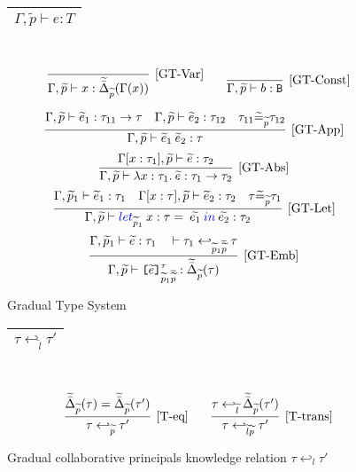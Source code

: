 \documentclass{article}
\newcommand{\emb}[3]{\texttt{[}#1\texttt{]}_{#2}^{#3}}
\newcommand{\tslam}[3]{\lambda #1 : #2. \: #3}
\newcommand{\plet}[5]{\textcolor[rgb]{0,0,1}{let}_{#1} \: {#2}:{#3} = \: #4 \: \textcolor[rgb]{0,0,1}{in} \: #5}
\newcommand\rulename[1]{\mathrm{\text{[#1]}}}
\newcommand\wt[1]{\widetilde{#1}}
\begin{document}
\begin{figure}[!htbp]
\begin{tabular}{ |c| } 
 \hline
 $\Gamma, \wt{p} \vdash e : T$  \\
 \hline
\end{tabular} \\
\[
\begin{tabular}{c c} 
\infer[\mathrm{\text{[GT-Var]}}] 
{\Gamma , \wt{p} \vdash x : \wt{\bar{\Delta}}_{\wt{p}}(\Gamma(x))}{} & 
\infer[\mathrm{\text{[GT-Const]}}] 
{\Gamma, \wt{p} \vdash b : \texttt{B} }{} \\
\end{tabular}
\] 

\[
\infer[\mathrm{\text{[GT-App]}}] 
{\Gamma, \wt{p} \vdash \wt{e}_1 \: \wt{e}_2 : \tau }
{\Gamma, \wt{p} \vdash \wt{e}_1 : \tau_{11} \rightarrow \tau \quad 
\Gamma, \wt{p} \vdash \wt{e}_2: \tau_{12} \quad \tau_{11} \wt{=}_{\wt{p}} \tau_{12}}
\]
\[
\infer[\mathrm{\text{[GT-Abs]}}] 
{\Gamma, \wt{p} \vdash \tslam{x}{\tau_1}{\wt{e}} : \tau_1 \rightarrow \tau_2}
{\Gamma [x : \tau_1], \wt{p} \vdash \wt{e} : \tau_2 } 
\]
\[
\infer[\mathrm{\text{[GT-Let]}}] 
{\Gamma, \wt{p} \vdash \plet{\wt{p}_1}{x}{\tau}{\wt{e_1}}{\wt{e_2}} : \tau_2}
{\Gamma, \wt{p}_1  \vdash \wt{e}_1 : \tau_1 \quad \Gamma [x:\tau], \wt{p} \vdash \wt{e}_2: \tau_2 \quad \tau \wt{=}_{\wt{p}} \tau_1 }  
\]
\[
\infer[\mathrm{\text{[GT-Emb]}}] 
{\Gamma, \wt{p} \vdash \emb{\wt{e}}{\wt{p}_1\overline{\wt{p}}}{\tau} : \wt{\bar{\Delta}}_{\wt{p}}(\tau)}
{\Gamma, \wt{p}_1  \vdash \wt{e} : \tau_1 \quad  \vdash \tau_1 \hookleftarrow_{\wt{p}_1\overline{\wt{p}}}  \tau  } 
\]
\caption{Gradual Type System}
		\label{fig:gradual-type-system}
	\end{figure}	
	
	\begin{figure}[!htbp]
\begin{tabular}{ |c| } 
 \hline
 $ \tau \hookleftarrow_{\wt{l}} \tau'$  \\
 \hline
\end{tabular} \\
\[
\begin{tabular}{c c} 
\infer[\rulename{T-eq}] 
{\tau \hookleftarrow_{\wt{p}} \tau'}{\wt{\bar{\Delta}}_{\wt{p}}(\tau) = \wt{\bar{\Delta}}_{\wt{p}}(\tau')} & 
\infer[\rulename{T-trans}] 
{\tau \hookleftarrow_{\wt{l}\wt{p}} \tau'}
{\tau \hookleftarrow_{\wt{l}} \wt{\bar{\Delta}}_{\wt{p}}(\tau') } \\
\end{tabular}
\]
\caption{Gradual collaborative principals knowledge relation $\tau \hookleftarrow_l \tau'$}
		\label{fig:unified_type-relation_transitive_equality}
	\end{figure}
	
\end{document}
